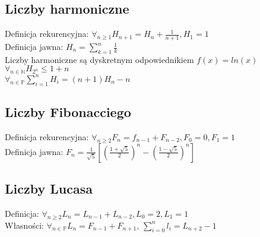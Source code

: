 \documentclass[a4paper,12pt]{article}
\begin{document}
\subsection{Liczby harmoniczne} %
Definicja rekurencyjna: $\forall_{n\geq1}H_{n+1}=H_n+\frac{1}{n+1}, H_1=1$ \\
Definicja jawna: $H_n=\sum_{k=1}^n\frac{1}{k}$ \\
Liczby harmoniczne są dyskretnym odpowiednikiem $f(x)=ln(x)$ \\
$\forall_{n\in \mathbb{N}} H_{2^n}\leq1+n$ \\
$\forall_{n \in \mathbb{P}}\sum_{i=1}^n H_i=(n+1)H_n-n$
\subsection{Liczby Fibonacciego}
Definicja rekurencyjna: $\forall_{n\geq2} F_n=f_{n-1}+F_{n-2}, F_0=0, F_1=1$ \\
Definicja jawna: $F_n=\frac{1}{\sqrt{5}}[(\frac{1+\sqrt{5}}{2})^n - (\frac{1-\sqrt{5}}{2})^n]$
\subsection{Liczby Lucasa}
Definicja: $\forall_{n\geq2} L_n=L_{n-1} +L_{n-2}, L_0=2, L_1=1$\\
Własności: $\forall_{n\in\mathbb{P}} L_n=F_{n-1} +F_{n+1}$, $\sum_{i=0}^n l_i=L_{n+2}-1$
\end{document}
